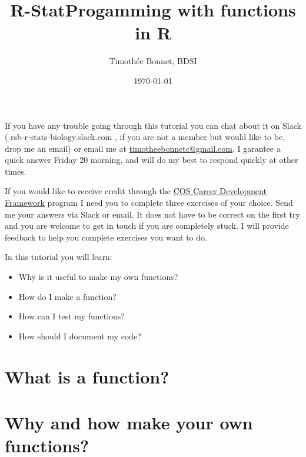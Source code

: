 \documentclass[12pt,a4paper]{scrartcl}\usepackage[]{graphicx}\usepackage[]{color}
\title{R-StatProgamming with functions in R}
\date{\today}
\author{Timoth\'ee Bonnet, BDSI}
\begin{document}
\maketitle

If you have any trouble going through this tutorial you can chat about it on Slack ( rsb-r-stats-biology.slack.com , if you are not a member but would like to be, drop me an email) or email me at \href{mailto:timotheebonnetc@gmail.com}{timotheebonnetc@gmail.com}. I garantee a quick answer Friday 20 morning, and will do my best to respond quickly at other times. 

If you would like to receive credit through the \href{https://wattlecourses.anu.edu.au/enrol/index.php?id=23938}{COS Career Development Framework} program I need you to complete three exercises of your choice. Send me your answers via Slack or email. It does not have to be correct on the first try and you are welcome to get in touch if you are completely stuck. I will provide feedback to help you complete exercises you want to do.

In this tutorial you will learn:

\begin{itemize}
    \item Why is it useful to make my own functions?
    \item How do I make a function?
    \item How can I test my functions?
    \item How should I document my code?
    
\end{itemize}

\tableofcontents
\ListOfExerciseInToc
{}

\clearpage



\section{What is a function?}



\section{Why and how make your own functions?}
\end{document}
